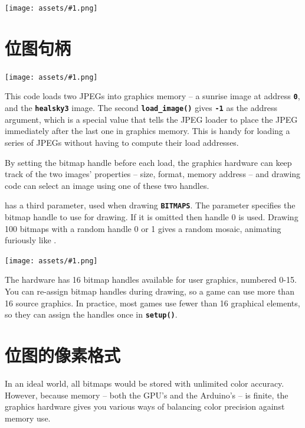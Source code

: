 \documentclass[10pt]{book}
\makeatletter
\newcommand{\png}[1]{
\begin{center}
\texttt{[image: assets/\#1.png]}
\end{center}
}
\newcommand{\mach}[1]{\texttt{\textbf{#1}}}
\newcommand{\cmdidx}[1]{
\index{#1@\mach{#1()}}
}
\newcommand{\dcmd}[1]{\cmdidx{#1}\nameref{#1}}
\makeatother
\begin{document}
\begin{CJK}{UTF8}{gkai}
\png{0009}
\clearpage

\section{位图句柄}
\label{bitmaphandles}

\png{jpeg2}


This code loads two JPEGs into graphics memory -- a sunrise image at address \mach{0}, and the \mach{healsky3} image.
The second \mach{load\_image()} gives \mach{-1} as the address argument, which is a special value that
tells the JPEG loader to place the JPEG immediately after the last one in graphics memory.
This is handy for loading a series of JPEGs without having to compute their load addresses.

By setting the bitmap handle before each load, the graphics hardware can keep track of the two images' properties -- size, format, memory address -- 
and drawing code can select an image using one of these two handles.

\dcmd{Vertex2ii} has a third parameter, used when drawing \mach{BITMAPS}.
The parameter specifies the bitmap handle to use for drawing.
If it is omitted then handle 0 is used.  
Drawing 100 bitmaps with a random handle 0 or 1
gives a random mosaic, animating furiously like .
\png{0010}

The hardware has 16 bitmap handles available for user graphics, numbered 0-15.
You can re-assign bitmap handles during drawing, so a game can use more than 16 source graphics.
In practice, most games use fewer than 16 graphical elements, so they can assign the handles once in \mach{setup()}.

\newpage
\section{位图的像素格式}

In an ideal world, all bitmaps would be stored with unlimited color accuracy.
However, because memory -- both the GPU's and the Arduino's -- is finite,
the graphics hardware gives you various ways of balancing color precision against memory use.

\newcommand{\fmline}[3]{
\index{#1 bitmap format@\mach{#1} bitmap format}
\index{bitmap format!#1@\mach{#1}}
\textbf{\large\mach{#1}} &
#3
& {\raisebox{-96pt}{\texttt{[image: \#2]}}} \\
}


\end{CJK}
\end{document}
